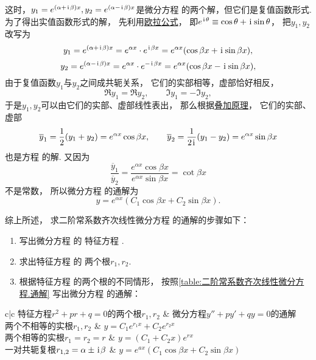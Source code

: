 \begin{enumerate}
这时，\(y_1 = e^{(\alpha+\kern1pt\mathrm{i}\kern1pt\beta)x}, y_2 = e^{(\alpha-\kern1pt\mathrm{i}\kern1pt\beta)x}\)是微分方程  的两个解，但它们是复值函数形式.
为了得出实值函数形式的解，
先利用\hyperref[equation:复数.欧拉公式]{欧拉公式}，
即\(e^{\kern1pt\mathrm{i}\kern1pt\theta} \equiv \cos\theta+\kern1pt\mathrm{i}\kern1pt\sin\theta\)，
把\(y_1,y_2\)改写为\[
	y_1 = e^{(\alpha+\kern1pt\mathrm{i}\kern1pt\beta)x} = e^{\alpha x} \cdot e^{\kern1pt\mathrm{i}\kern1pt\beta x}
	= e^{\alpha x} (\cos\beta x + \kern1pt\mathrm{i}\kern1pt \sin\beta x),
\]\[
	y_2 = e^{(\alpha-\kern1pt\mathrm{i}\kern1pt\beta)x} = e^{\alpha x} \cdot e^{-\kern1pt\mathrm{i}\kern1pt\beta x}
	= e^{\alpha x} (\cos\beta x - \kern1pt\mathrm{i}\kern1pt \sin\beta x),
\]
由于复值函数\(y_1\)与\(y_2\)之间成共轭关系，
它们的实部相等，虚部恰好相反，\[
	\Re y_1 = \Re y_2, \qquad
	\Im y_1 = -\Im y_2,
\]
于是\(y_1,y_2\)可以由它们的实部、虚部线性表出，
那么根据\hyperref[theorem:微分方程.二阶非齐次线性微分方程的解的叠加原理]{叠加原理}，
它们的实部、虚部\[
	\overline{y}_1 = \frac{1}{2} (y_1 + y_2) = e^{\alpha x} \cos\beta x,
	\qquad
	\overline{y}_2 = \frac{1}{2\kern1pt\mathrm{i}\kern1pt} (y_1 - y_2) = e^{\alpha x} \sin\beta x
\]也是方程  的解.
又因为\[
	\frac{\overline{y}_1}{\overline{y}_2}
	= \frac{e^{\alpha x} \cos\beta x}{e^{\alpha x} \sin\beta x}
	= \cot\beta x
\]不是常数，
所以微分方程  的通解为\[
	y = e^{\alpha x} (C_1 \cos\beta x + C_2 \sin\beta x).
\]
\end{enumerate}

综上所述，
求二阶常系数齐次线性微分方程  的通解的步骤如下：
\begin{enumerate}
	\item
	写出微分方程  的
	特征方程 .

	\item
	求出特征方程  的
	两个根\(r_1,r_2\).

	\item
	根据特征方程  的两个根的不同情形，
	按照\cref{table:二阶常系数齐次线性微分方程.通解}
	写出微分方程  的通解：
\end{enumerate}

\begin{table}[ht]
	\centering
	\begin{tblr}{c|c}
		\hline
		特征方程\(r^2+pr+q=0\)的两个根\(r_1,r_2\)
			& 微分方程\(y''+py'+qy = 0\)的通解 \\ \hline
		两个不相等的实根\(r_1,r_2\)
			& \(y = C_1 e^{r_1 x} + C_2 e^{r_2 x}\) \\
		两个相等的实根\(r_1=r_2=r\)
			& \(y = (C_1 + C_2 x) e^{r x}\) \\
		一对共轭复根\(r_{1,2}=\alpha\pm\kern1pt\mathrm{i}\kern1pt\beta\)
			& \(y = e^{ax} (C_1 \cos{\beta x} + C_2 \sin{\beta x})\) \\ \hline
	\end{tblr}
	\caption{}
	\label{table:二阶常系数齐次线性微分方程.通解}
\end{table}

